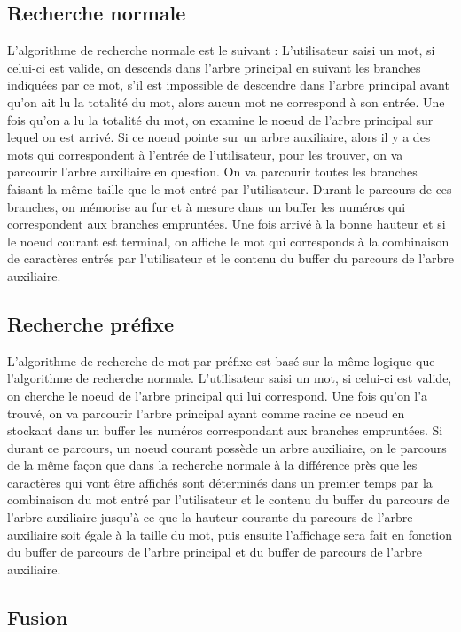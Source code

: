 \documentclass[15pt, a4paper]{article}
\begin{document}
\subsection{Recherche normale}

L'algorithme de recherche normale est le suivant : L'utilisateur saisi un mot,
si celui-ci est valide, on descends dans l'arbre principal en suivant les 
branches indiquées par ce mot, s'il est impossible de descendre 
dans l'arbre principal avant qu'on ait lu la totalité du mot, alors aucun mot ne
correspond à son entrée. Une fois qu'on a lu la totalité du mot, on examine le
noeud de l'arbre principal sur lequel on est arrivé. Si ce noeud pointe sur 
un arbre auxiliaire, alors il y
a des mots qui correspondent à l'entrée de l'utilisateur, pour les trouver,
on va parcourir l'arbre auxiliaire en question. On va parcourir toutes les 
branches faisant la même taille que le mot entré par l'utilisateur. Durant le 
parcours de ces branches, on mémorise au fur et à mesure dans un buffer les 
numéros qui correspondent aux branches empruntées. 
Une fois arrivé à la bonne hauteur et si le noeud courant est 
terminal, on affiche le mot qui corresponds à la combinaison de caractères entrés
par l'utilisateur et le contenu du buffer du parcours de l'arbre auxiliaire.

\subsection{Recherche préfixe}

L'algorithme de recherche de mot par préfixe est basé sur la même logique que
l'algorithme de recherche normale. L'utilisateur saisi un mot, si celui-ci est
valide, on cherche le noeud de l'arbre principal qui lui correspond. Une fois
qu'on l'a trouvé, on va parcourir l'arbre principal ayant comme racine ce 
noeud en stockant dans un buffer les numéros correspondant aux branches 
empruntées. Si durant ce parcours, un noeud courant possède un arbre auxiliaire,
on le parcours de la même façon que dans la recherche normale à la différence 
près que les caractères qui vont être affichés sont déterminés dans un premier 
temps par la combinaison du mot entré par l'utilisateur et le contenu du buffer
du parcours de l'arbre auxiliaire jusqu'à ce que la hauteur courante du parcours
de l'arbre auxiliaire soit égale à la taille du mot, puis ensuite l'affichage 
sera fait en fonction du buffer de parcours de l'arbre principal et du buffer de
parcours de l'arbre auxiliaire.

\subsection{Fusion}
\end{document}
